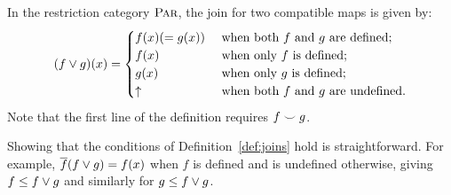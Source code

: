 \begin{example}\label{ex:joins_in_par}
In the restriction category $\textsc{Par}$, the join for two compatible maps is given by:
\[(f \vee g) (x) = \begin{cases}
  f(x)( = g(x))& \text{ when both $f$ and $g$ are defined;}\\
  f(x)& \text{ when only $f$ is defined;}\\
  g(x)& \text{ when only $g$ is defined;}\\
  \uparrow & \text{ when both $f$ and $g$ are undefined.}
\end{cases}
\]
Note that the first line of the definition requires $f\smile g$.

Showing that the conditions of Definition~\ref{def:joins} hold is straightforward. For example,
$\overline{f}(f\vee g) = f(x)$ when $f$ is defined and is undefined otherwise, giving $f \le f\vee g$
and similarly for $g \le f \vee g$.

\end{example}
